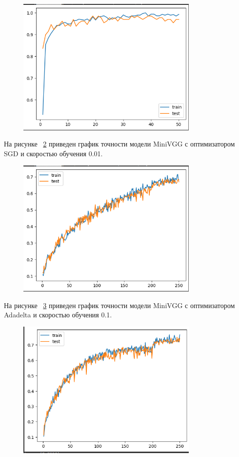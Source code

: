 \documentclass[a4paper, 14pt]{extarticle}
\begin{document}
\begin{figure}[H]
\centering
\includegraphics[width=0.8\textwidth]{images/res4.png}
\caption{}
\label{fig:img4}
\end{figure}

На рисунке ~\ref{fig:img5} приведен график точности модели MiniVGG с оптимизатором SGD и скоростью обучения 0.01.

\begin{figure}[H]
\centering
\includegraphics[width=0.8\textwidth]{images/res5.png}
\caption{}
\label{fig:img5}
\end{figure}

На рисунке ~\ref{fig:img6} приведен график точности модели MiniVGG с оптимизатором Adadelta и скоростью обучения 0.1.

\begin{figure}[H]
\centering
\includegraphics[width=0.8\textwidth]{images/res6.png}
\caption{}
\label{fig:img6}
\end{figure}
\end{document}
